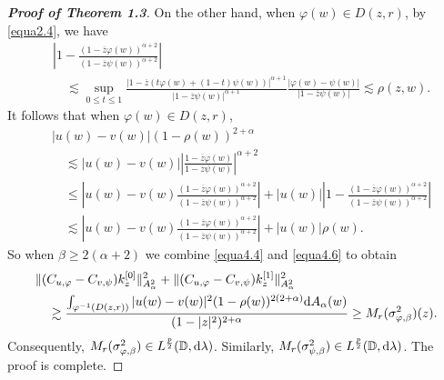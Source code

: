 \documentclass[preprint,12pt,times]{elsarticle}
\theoremstyle{definition}
\theoremstyle{remark}
\numberwithin{equation}{section}
\begin{document}
\begin{proof}[{\bf Proof of Theorem 1.3}]
On the other hand, when $\varphi(w)\in D(z,r)$, by \eqref{equa2.4}, we have
\begin{equation*}
\begin{split}
&\left|1-\frac{(1-\overline{z}\varphi(w))^{\alpha+2}}{(1-\overline{z}\psi(w))^{\alpha+2}}\right|\\
&\quad\lesssim \sup_{0\leq t\leq 1}\frac{|1-\overline{z}(t\varphi(w)+(1-t)\psi(w))|^{\alpha+1}}{|1-\overline{z}\psi(w)|^{\alpha+1}}\frac{|\varphi(w)-\psi(w)|}{|1-\overline{z}\psi(w)|}\lesssim \rho(z,w).
\end{split}
\end{equation*}
It follows that when $\varphi(w)\in D(z,r)$, 
\begin{align*}
&|u(w)-v(w)|(1-\rho(w))^{2+\alpha}\\
&\quad\lesssim |u(w)-v(w)|\left|\frac{1-\overline{z}\varphi(w)}{1-\overline{z}\psi(w)}\right|^{\alpha+2}\\
&\quad \leq \left|u(w)-v(w)\frac{(1-\overline{z}\varphi(w))^{\alpha+2}}{(1-\overline{z}\psi(w))^{\alpha+2}}\right|+|u(w)|\left|1-\frac{(1-\overline{z}\varphi(w))^{\alpha+2}}{(1-\overline{z}\psi(w))^{\alpha+2}}\right|\\
&\quad \lesssim \left|u(w)-v(w)\frac{(1-\overline{z}\varphi(w))^{\alpha+2}}{(1-\overline{z}\psi(w))^{\alpha+2}}\right|+|u(w)|\rho(w).
\end{align*}
So when $\beta\geq 2(\alpha+2)$ we combine \eqref{equa4.4} and \eqref{equa4.6} to obtain
\begin{equation*}
\begin{split}
&\|(C_{u,\varphi}-C_{v,\psi})k_z^{[0]}\|_{A_{\alpha}^2}^2+\|(C_{u,\varphi}-C_{v,\psi})k_z^{[1]}\|_{A_{\alpha}^2}^2\\
&\quad \gtrsim\frac{\int_{\varphi^{-1}(D(z,r))}|u(w)-v(w)|^2(1-\rho(w))^{2(2+\alpha)}{\rm d}A_{\alpha}(w)}{(1-|z|^2)^{2+\alpha}}\geq M_r(\sigma_{\varphi,\beta}^2)(z).
\end{split}
\end{equation*}
Consequently, $M_r(\sigma_{\varphi,\beta}^2)\in L^{\frac{p}{2}}(\mathbb{D},{\rm d}\lambda)$. Similarly, $M_r(\sigma_{\psi,\beta}^2)\in L^{\frac{p}{2}}(\mathbb{D},{\rm d}\lambda)$. The proof is complete.
\end{proof}
\end{document}
